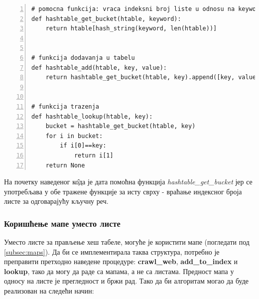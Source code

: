 \begin{lstlisting}[caption= \emph{add} и \emph{lookup} функције, label={lst:addlookup}, numbers = left]
# pomocna funkcija: vraca indeksni broj liste u odnosu na keyword
def hashtable_get_bucket(htable, keyword):
    return htable[hash_string(keyword, len(htable))]


# funkcija dodavanja u tabelu
def hashtable_add(htable, key, value):
    return hashtable_get_bucket(htable, key).append([key, value])


# funkcija trazenja
def hashtable_lookup(htable, key):
    bucket = hashtable_get_bucket(htable, key)
    for i in bucket:
        if i[0]==key:
            return i[1]
    return None
\end{lstlisting}

На почетку наведеног к\^{о}да је дата помоћна функција \emph{hashtable\_get\_bucket} јер се употребљава у обе тражене функције за исту сврху - враћање индексног броја листе за одговарајућу кључну реч.

\subsubsection{Коришћење мапе уместо листе}

Уместо листе за прављење хеш табеле, могуће је користити мапе (погледати под \ref{subsec:maps}). Да би се имплементирала таква структура, потребно је преправити претходно наведене процедуре: \textbf{crawl\_web}, \textbf{add\_to\_index} и \textbf{lookup}, тако да могу да раде са мапама, а не са листама. Предност мапа у односу на листе је прегледност и бржи рад. Тако да би алгоритам могао да буде реализован на следећи начин:

